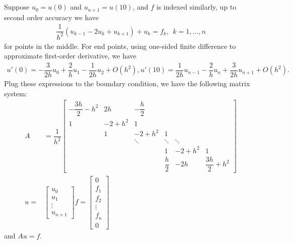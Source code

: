 \documentclass[11pt]{article}
\begin{document}
\pagebreak
\section{}
\subsection{}
Suppose $u_0=u(0)$ and $u_{n+1} = u(10)$, and $f$ is indexed similarly, up to second order accuracy we have 
\begin{equation}\begin{split}
\dfrac1{h^2}(u_{k-1}-2u_k+u_{k+1}) + u_k = f_k,\ \ k=1,...,n
\end{split}\end{equation}
for points in the middle. For end points, using one-sided finite difference to approximate first-order derivative, we have 
\begin{equation}\begin{split}
u'(0) = -\dfrac3{2h}u_0+\dfrac2h u_1 - \dfrac1{2h}u_2 + O(h^2),
u'(10) = \dfrac1{2h}u_{n-1} -\dfrac2h u_n +\dfrac3{2h}u_{n+1} + O(h^2).
\end{split}\end{equation} 
Plug these expressions to the boundary condition, we have the following matrix system:
\begin{equation}\begin{split}
A &=\dfrac1{h^2}
\begin{bmatrix}
-\dfrac{3h}2-h^2 & 2h & -\dfrac h2 \\
1 & -2 + h^2 & 1 \\
& 1& -2 + h^2 & 1 \\
& & \ddots & \ddots & \ddots \\
& & & 1 & -2 + h^2 & 1 \\
& & & \dfrac{h}2 & -2h & \dfrac{3h}2 + h^2
\end{bmatrix} \\
u =& 
\begin{bmatrix}
u_0 \\ u_1 \\ \vdots \\ u_{n+1}
\end{bmatrix} 
f = 
\begin{bmatrix}
0 \\ f_1 \\ f_2 \\ \vdots \\ f_n \\ 0
\end{bmatrix} 
\end{split}\end{equation}
and $Au=f$.
\end{document}
